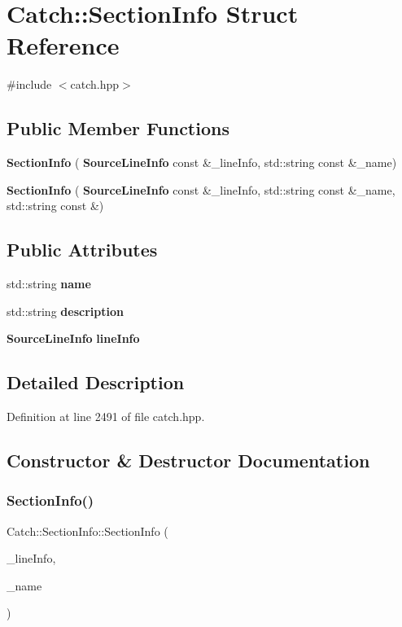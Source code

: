 \section{Catch\+::Section\+Info Struct Reference}
\label{struct_catch_1_1_section_info}


{\ttfamily \#include $<$catch.\+hpp$>$}

\subsection*{Public Member Functions}
\begin{DoxyCompactItemize}
\item 
\textbf{ Section\+Info} (\textbf{ Source\+Line\+Info} const \&\+\_\+line\+Info, std\+::string const \&\+\_\+name)
\item 
\textbf{ Section\+Info} (\textbf{ Source\+Line\+Info} const \&\+\_\+line\+Info, std\+::string const \&\+\_\+name, std\+::string const \&)
\end{DoxyCompactItemize}
\subsection*{Public Attributes}
\begin{DoxyCompactItemize}
\item 
std\+::string \textbf{ name}
\item 
std\+::string \textbf{ description}
\item 
\textbf{ Source\+Line\+Info} \textbf{ line\+Info}
\end{DoxyCompactItemize}


\subsection{Detailed Description}


Definition at line 2491 of file catch.\+hpp.



\subsection{Constructor \& Destructor Documentation}
\mbox{\label{struct_catch_1_1_section_info_a2808437ae7d4bc0830cee1c3995165a6}} 
\subsubsection{SectionInfo()\hspace{0.1cm}{\footnotesize\ttfamily [1/2]}}
{\footnotesize\ttfamily Catch\+::\+Section\+Info\+::\+Section\+Info (\begin{DoxyParamCaption}\item[{\textbf{ Source\+Line\+Info} const \&}]{\+\_\+line\+Info,  }\item[{std\+::string const \&}]{\+\_\+name }\end{DoxyParamCaption})}

